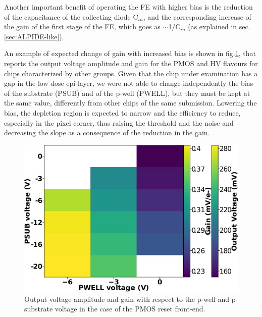         Another important benefit of operating the FE with higher bias is the reduction of the capacitance of the collecting diode C$_{in}$, and the corresponding increase of the gain of the first stage of the FE, which goes as $\sim$1/C$_{in}$ (as explained in sec. \ref{sec:ALPIDE-like}). 
    
        An example of expected change of gain with increased bias is shown in fig.\ref{fig:gain_vs_bias}, that reports the output voltage amplitude and gain for the PMOS and HV flavours for chips characterized by other groups.
        Given that the chip under examination has a gap in the low dose epi-layer, we were not able to change independently the bias of the substrate (PSUB) and of the p-well (PWELL), but they must be kept at the same value, differently from other chips of the same submission.
        Lowering the bias, the depletion region is expected to narrow and the efficiency to reduce, especially in the pixel corner, thus raising the threshold and the noise and decreasing the slope as a consequence of the reduction in the gain.
        \begin{figure}[h!]
            \centering
            \includegraphics[width=.5\linewidth]{figures/Monopix1/PMOS_gain_bias.png}          
            \caption{Output voltage amplitude and gain with respect to the p-well and p-substrate voltage in the case of the PMOS reset front-end.  }
            \label{fig:gain_vs_bias}
        \end{figure}  

